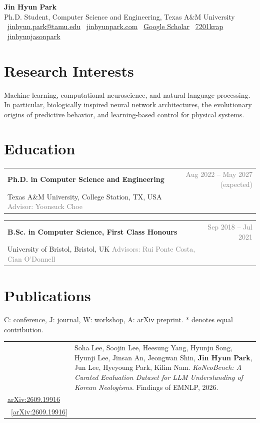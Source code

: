 \documentclass[10pt,letterpaper]{article}
\makeatletter
\newcommand{\entry}[3]{%
  \par\vspace{4pt}%
  \begin{tabularx}{\textwidth}{@{}X@{\hspace{1em}}r@{}}
    \textbf{#1} & \textcolor{gray}{#2}\\
    {#3} & \\
  \end{tabularx}\par\vspace{-2pt}}
\newcommand{\pub}[5]{%
  \par\vspace{4pt}%
  \begin{tabularx}{\textwidth}{@{}p{2.9em}@{}X@{}}
    \makebox[2.6em][c]{\textcolor{accent}{[#1]}} & #2. \emph{#3}. #4.\ifx\\#5\\\else\ [#5]\fi\\
  \end{tabularx}}
\newcommand{\me}{\textbf{Jin Hyun Park}}
\makeatother
\begin{document}
\begin{center}
  {\Huge\bfseries Jin Hyun Park}\\[3pt]
  {\normalsize\color{gray}Ph.D. Student, Computer Science and Engineering, Texas A\&M University}\\[6pt]
  {\small
    \faEnvelope\ \href{mailto:jinhyun.park@tamu.edu}{jinhyun.park@tamu.edu}\quad
    \faGlobe\ \href{https://jinhyunpark.com}{jinhyunpark.com}\quad
    \faGraduationCap\ \href{https://scholar.google.com/citations?user=D29N4akAAAAJ}{Google Scholar}\quad
    \faGithub\ \href{https://github.com/7201krap}{7201krap}\quad
    \faLinkedin\ \href{https://www.linkedin.com/in/jinhyunjasonpark/}{jinhyunjasonpark}
  }
\end{center}

\section{Research Interests}
Machine learning, computational neuroscience, and natural language processing. In particular,
biologically inspired neural network architectures, the evolutionary origins of predictive behavior,
and learning-based control for physical systems.

\section{Education}

\entry{Ph.D. in Computer Science and Engineering}{Aug 2022 -- May 2027 (expected)}
      {Texas A\&M University, College Station, TX, USA \quad\textcolor{gray}{Advisor: Yoonsuck Choe}}

\entry{B.Sc. in Computer Science, First Class Honours}{Sep 2018 -- Jul 2021}
      {University of Bristol, Bristol, UK \quad\textcolor{gray}{Advisors: Rui Ponte Costa, Cian O'Donnell}}

\section{Publications}
{\small\color{gray}C: conference, J: journal, W: workshop, A: arXiv preprint. * denotes equal contribution.\par}

\pub{C2}{Soha Lee, Soojin Lee, Heesung Yang, Hyunju Song, Hyunji Lee, Jinsan An, Jeongwan Shin, \me, Jun Lee, Hyeyoung Park, Kilim Nam}
    {KoNeoBench: A Curated Evaluation Dataset for LLM Understanding of Korean Neologisms}
    {Findings of EMNLP, 2026}
    {\href{https://arxiv.org/abs/2609.19916}{arXiv:2609.19916}}
\end{document}
